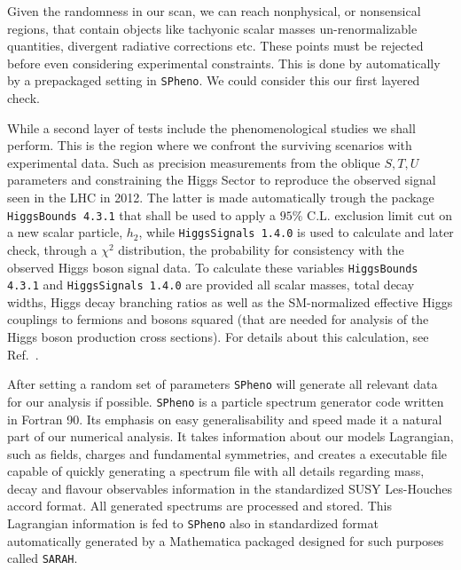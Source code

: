Given the randomness in our scan, we can reach nonphysical, or nonsensical regions, that contain objects like tachyonic scalar masses un-renormalizable quantities, divergent radiative corrections etc. 
%
These points must be rejected before even considering experimental constraints. This is done by automatically by a prepackaged setting in \texttt{SPheno}. 
%
We could consider this our first layered check. 

While a second layer of tests include the phenomenological studies we shall perform. 
%
This is the region where we confront the surviving scenarios with experimental data. 
%
Such as precision measurements from the oblique $S,T,U$ parameters and constraining the Higgs Sector to reproduce the observed signal seen in the LHC in 2012. 
%
The latter is made automatically trough the package \texttt{HiggsBounds 4.3.1} that shall be used to apply a $95\%$ C.L. exclusion limit cut on a new scalar particle, $h_2$, while \texttt{HiggsSignals 1.4.0} is used to calculate and later check, through a $\chi^2$ distribution, the probability for consistency with the observed Higgs boson signal data. 
% 
To calculate these variables \texttt{HiggsBounds 4.3.1} and \texttt{HiggsSignals 1.4.0} are provided all scalar masses, total decay widths, Higgs decay branching ratios as well as the SM-normalized effective Higgs couplings to fermions and bosons squared (that are needed for analysis of the Higgs boson production cross sections). For details about this calculation, see Ref.~\cite{Bechtle:2013wla}.

{ \color{gray} After setting a random set of parameters \texttt{SPheno} will generate all relevant data for our analysis if possible. \texttt{SPheno} is a particle spectrum generator code written in Fortran 90. Its emphasis on easy generalisability and speed made it a natural part of our numerical analysis. It takes information about our models Lagrangian, such as fields, charges and fundamental symmetries, and creates a executable file capable of quickly generating a spectrum file with all details regarding mass, decay and flavour observables information in the standardized SUSY Les-Houches accord format. All generated spectrums are processed and stored. 
%
This Lagrangian information is fed to \texttt{SPheno} also in standardized format automatically generated by a Mathematica packaged designed for such purposes called \texttt{SARAH}. }

